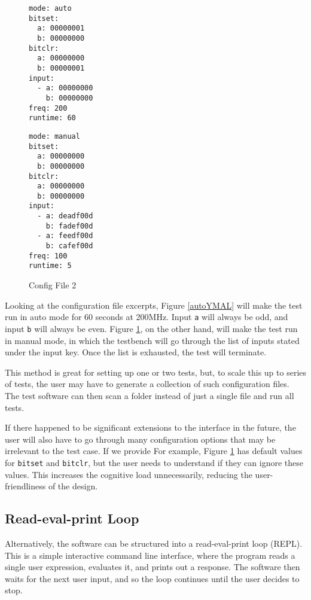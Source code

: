 \begin{figure}[H]
  \centering
  \begin{minipage}[b]{.35\linewidth}
  \begin{verbatim}
mode: auto
bitset:
  a: 00000001
  b: 00000000
bitclr:
  a: 00000000
  b: 00000001
input:
  - a: 00000000
    b: 00000000
freq: 200
runtime: 60
  \end{verbatim}
  \caption{Config File 1}
  \label{autoYMAL}
  \end{minipage}%
  \begin{minipage}[b]{.35\linewidth}
  \begin{verbatim}
mode: manual
bitset:
  a: 00000000
  b: 00000000
bitclr:
  a: 00000000
  b: 00000000
input:
  - a: deadf00d
    b: fadef00d
  - a: feedf00d
    b: cafef00d
freq: 100
runtime: 5
  \end{verbatim}
  \caption{Config File 2}
  \label{manYMAL}
  \end{minipage}
\end{figure}

Looking at the configuration file excerpts, Figure \ref{autoYMAL} will make the test run in auto mode for 60 seconds at 200MHz.
Input \texttt{a} will always be odd, and input \texttt{b} will always be even.
Figure \ref{manYMAL}, on the other hand, will make the test run in manual mode, in which the testbench will go through the list of inputs stated under the input key.
Once the list is exhausted, the test will terminate.

This method is great for setting up one or two tests, but, to scale this up to series of tests, the user may have to generate a collection of such configuration files.
The test software can then scan a folder instead of just a single file and run all tests.

If there happened to be significant extensions to the interface in the future, the user will also have to go through many configuration options that may be irrelevant to the test case.
If we provide 
For example, Figure \ref{manYMAL} has default values for \texttt{bitset} and \texttt{bitclr}, but the user needs to understand if they can ignore these values.
This increases the cognitive load unnecessarily, reducing the user-friendliness of the design.

\subsection{Read-eval-print Loop}

Alternatively, the software can be structured into a read-eval-print loop (REPL).
This is a simple interactive command line interface, where the program reads a single user expression, evaluates it, and prints out a response.
The software then waits for the next user input, and so the loop continues until the user decides to stop.

